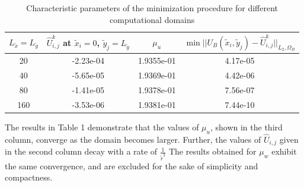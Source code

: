 \documentclass[12pt]{article}
\theoremstyle{theorem}
\theoremstyle{defi}
\begin{document}
\begin{center}
\begin{table}[ht]
\centering
		\begin{tabular}{||c|| c | c | c ||}
			\hline
			\hline
      $ L_{\tilde x} = L_{\tilde y}$        &         $\widehat{U}_{i,j}^k$ at  $\tilde {x}_i = 0$, $ \tilde {y}_j =   L_{\tilde y}$    &    $\mu_u$  &    $\min|| U_B( \tilde x_i, \tilde y_j) - \widehat U ^k_{i,j} ||_{L_2,\Omega_B}$\\
   			\hline 
			\hline 
      20    & -2.23e-04    &  1.9355e-01  &     4.17e-05  \\
               	 \hline 
    40      & -5.65e-05   &   1.9369e-01    &    4.42e-06 \\
			\hline 	
      80    & -1.41e-05  &      1.9378e-01      &       7.56e-07  \\
			\hline 	
     160     & -3.53e-06  &    1.9381e-01        &     7.44e-10 \\
		   \hline
	             \hline 
                     \end{tabular}
\caption{Characteristic parameters of the minimization procedure for different computational domains}

\label{tab:fourth-der}
\end{table}
\end{center}

The results in Table 1 demonstrate that the values of $\mu_u$, shown in the third column, converge as the domain becomes larger. Further, the values of $\widehat{U}_{i,j}$ given  in the second column decay with a rate of $\frac{1}{\tilde r^2}$
The results obtained for  $\mu_w$  exhibit the same convergence, and are excluded for the sake of simplicity and compactness.
\end{document}
